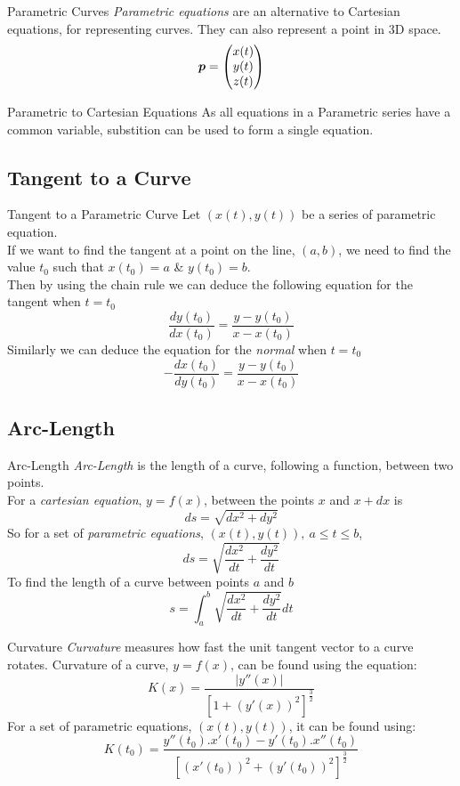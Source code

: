 \documentclass[11pt,a4paper]{article}
\begin{document}
\subtitle{Definition 5.01 - }{Parametric Curves}
\textit{Parametric equations} are an alternative to Cartesian equations, for representing curves. They can also represent a point in 3D space.
$$\boldsymbol{p} = \begin{pmatrix} x(t)\\ y(t)\\ z(t) \end{pmatrix}$$

\subtitle{Theorem 5.02 - }{Parametric to Cartesian Equations}
As all equations in a Parametric series have a common variable, substition can be used to form a single equation. \\

\subsection{Tangent to a Curve}

\subtitle{Theorem 5.02 - }{Tangent to a Parametric Curve}
Let $(x(t), y(t))$ be a series of parametric equation.\\
If we want to find the tangent at a point on the line, $(a, b)$, we need to find the value $t_0$ such that $x(t_0) = a$ \& $y(t_0) = b$. \\
Then by using the chain rule we can deduce the following equation for the tangent when $t = t_0$
$$\frac{dy(t_0)}{dx(t_0)} = \frac{y - y(t_0)}{x - x(t_0)}$$
Similarly we can deduce the equation for the \textit{normal} when $t = t_0$
$$-\frac{dx(t_0)}{dy(t_0)} = \frac{y - y(t_0)}{x - x(t_0)}$$

\subsection{Arc-Length}

\subtitle{Theorem 5.03 - }{Arc-Length}
\textit{Arc-Length} is the length of a curve, following a function, between two points.\\
For a \textit{cartesian equation}, $y = f(x)$, between the points $x$ and $x + dx$ is $$ds = \sqrt{dx^2 + dy^2}$$
So for a set of \textit{parametric equations}, $(x(t), y(t)),\ a \leq t \leq b$, $$ds = \sqrt{\frac{dx^2}{dt} + \frac{dy^2}{dt}}$$
To find the length of a curve between points $a$ and $b$ $$s = \int_{a}^{b} \sqrt{\frac{dx^2}{dt} + \frac{dy^2}{dt}} dt$$

\subtitle{Definition 5.04 - }{Curvature}
\textit{Curvature} measures how fast the unit tangent vector to a curve rotates.
Curvature of a curve, $y = f(x)$, can be found using the equation: $$K(x) = \frac{|y''(x)|}{[1 + (y'(x))^2]^{\frac{3}{2}}}$$
For a set of parametric equations, $(x(t), y(t))$, it can be found using: $$K(t_0) = \frac{y''(t_0).x'(t_0) - y'(t_0).x''(t_0)}{[(x'(t_0))^2 + (y'(t_0))^2]^{\frac{3}{2}}}$$
\end{document}
